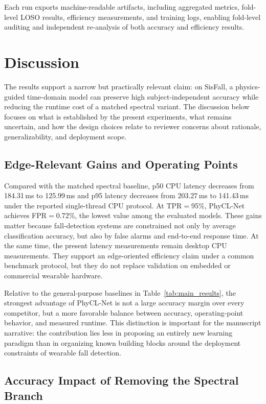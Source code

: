 \documentclass[jec]{acnsart}
\begin{document}
Each run exports machine-readable artifacts, including aggregated metrics, fold-level LOSO results, efficiency measurements, and training logs, enabling fold-level auditing and independent re-analysis of both accuracy and efficiency results.


\section{Discussion}

The results support a narrow but practically relevant claim: on SisFall, a physics-guided time-domain model can preserve high subject-independent accuracy while reducing the runtime cost of a matched spectral variant. The discussion below focuses on what is established by the present experiments, what remains uncertain, and how the design choices relate to reviewer concerns about rationale, generalizability, and deployment scope.

\subsection{Edge-Relevant Gains and Operating Points}

Compared with the matched spectral baseline, p50 CPU latency decreases from 184.31\,ms to 125.99\,ms and p95 latency decreases from 203.27\,ms to 141.43\,ms under the reported single-thread CPU protocol. At TPR${=}$95\%, PhyCL-Net achieves FPR${=}$0.72\%, the lowest value among the evaluated models. These gains matter because fall-detection systems are constrained not only by average classification accuracy, but also by false alarms and end-to-end response time. At the same time, the present latency measurements remain desktop CPU measurements. They support an edge-oriented efficiency claim under a common benchmark protocol, but they do not replace validation on embedded or commercial wearable hardware.

Relative to the general-purpose baselines in Table~\ref{tab:main_results}, the strongest advantage of PhyCL-Net is not a large accuracy margin over every competitor, but a more favorable balance between accuracy, operating-point behavior, and measured runtime. This distinction is important for the manuscript narrative: the contribution lies less in proposing an entirely new learning paradigm than in organizing known building blocks around the deployment constraints of wearable fall detection.

\subsection{Accuracy Impact of Removing the Spectral Branch}
\end{document}
